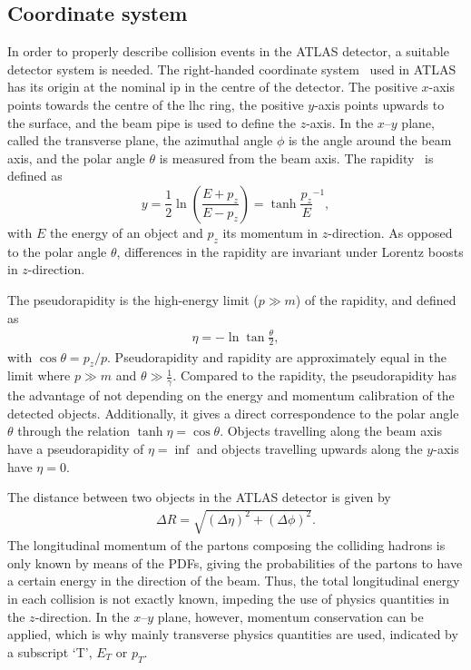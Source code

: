 \subsection{Coordinate system}

In order to properly describe collision events in the ATLAS detector, a suitable detector system is needed. The right-handed coordinate system~\cite{ATLAS:1999uwa} used in ATLAS has its origin at the nominal \gls{ip} in the centre of the detector. The positive $x$-axis points towards the centre of the \gls{lhc} ring, the positive $y$-axis points upwards to the surface, and the beam pipe is used to define the $z$-axis. In the $x$--$y$ plane, called the transverse plane, the azimuthal angle $\phi$ is the angle around the beam axis, and the polar angle $\theta$ is measured from the beam axis. The rapidity~\cite{pdg2020} is defined as
\begin{equation}
	y = \frac{1}{2}\ln\left(\frac{E+p_z}{E-p_z}\right) = \tanh{\frac{p_z}{E}}^{-1},
\end{equation}
with $E$ the energy of an object and $p_z$ its momentum in $z$-direction. As opposed to the polar angle $\theta$, differences in the rapidity are invariant under Lorentz boosts in $z$-direction.

The pseudorapidity \cite{pdg2020} is the high-energy limit ($p\gg m$) of the rapidity, and defined as
\begin{align}
	\eta = - \ln\tan\frac{\theta}{2},
\end{align}
with $\cos\theta = p_z/p$. Pseudorapidity and rapidity are approximately equal in the limit where $p\gg m$ and $\theta \gg \frac{1}{\gamma}$. Compared to the rapidity, the pseudorapidity has the advantage of not depending on the energy and momentum calibration of the detected objects. Additionally, it gives a direct correspondence to the polar angle $\theta$ through the relation $\tanh\eta = \cos\theta$. Objects travelling along the beam axis have a pseudorapidity of $\eta = \inf$ and objects travelling upwards along the $y$-axis have $\eta = 0$.

The distance between two objects in the ATLAS detector is given by
\begin{align}
	\Delta R=\sqrt{\left(\Delta \eta\right)^2+\left(\Delta \phi\right)^2}.
\end{align}
The longitudinal momentum of the partons composing the colliding hadrons is only known by means of the \glspl{PDF}, giving the probabilities of the partons to have a certain energy in the direction of the beam. Thus, the total longitudinal energy in each collision is not exactly known, impeding the use of physics quantities in the $z$-direction. In the $x$--$y$ plane, however, momentum conservation can be applied, which is why mainly transverse physics quantities are used, indicated by a subscript `T', \eg $E_T$ or $p_T$.

